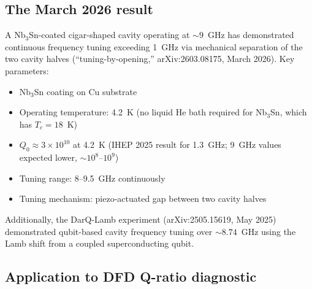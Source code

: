 \documentclass[11pt]{article}
\newcommand{\ee}[1]{\times 10^{#1}}
\theoremstyle{definition}
\theoremstyle{remark}
\begin{document}
\subsection{The March 2026 result}

A Nb$_3$Sn-coated cigar-shaped cavity operating at $\sim 9$~GHz has
demonstrated continuous frequency tuning exceeding 1~GHz via mechanical
separation of the two cavity halves (``tuning-by-opening,''
arXiv:2603.08175, March 2026). Key parameters:
\begin{itemize}[nosep]
\item Nb$_3$Sn coating on Cu substrate
\item Operating temperature: 4.2~K (no liquid He bath required for
  Nb$_3$Sn, which has $T_c = 18$~K)
\item $Q_0 \approx 3\ee{10}$ at 4.2~K (IHEP 2025 result for 1.3~GHz;
  9~GHz values expected lower, $\sim 10^8$--$10^9$)
\item Tuning range: 8--9.5~GHz continuously
\item Tuning mechanism: piezo-actuated gap between two cavity halves
\end{itemize}

Additionally, the DarQ-Lamb experiment (arXiv:2505.15619, May 2025)
demonstrated qubit-based cavity frequency tuning over $\sim 8.74$~GHz
using the Lamb shift from a coupled superconducting qubit.

\subsection{Application to DFD Q-ratio diagnostic}
\end{document}
